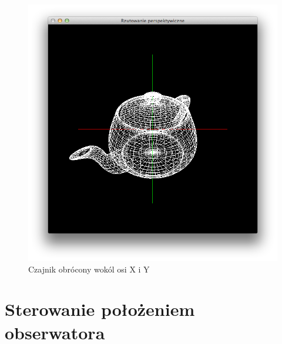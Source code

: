 \documentclass[wide,a4paper,titlepage,12pt] {article}
\begin{document}
  \newpage
  \begin{figure}[h!]
    \begin{center}
      \includegraphics[width=\textwidth]{1.png}
      \caption{Czajnik obrócony wokól osi X i Y}
    \end{center}
  \end{figure}

  \newpage

  \section{Sterowanie położeniem obserwatora}
\end{document}
